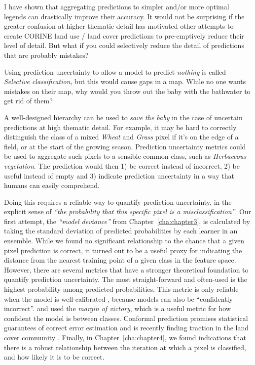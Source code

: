        I have shown that aggregating predictions to simpler and/or more optimal legends can drastically improve their accuracy. It would not be surprising if the greater confusion at higher thematic detail has motivated other attempts to create CORINE land use / land cover predictions to pre-emptively reduce their level of detail. But what if you could selectively reduce the detail of predictions that are probably mistakes? 
        
        Using prediction uncertainty to allow a model to predict \textit{nothing} is called \textit{Selective classification}, but this would cause gaps in a map. While no one wants mistakes on their map, why would you throw out the baby with the bathwater to get rid of them? 
        
        A well-designed hierarchy can be used to \textit{save the baby} in the case of uncertain predictions at high thematic detail. For example, it may be hard to correctly distinguish the class of a mixed \textit{Wheat} and \textit{Grass} pixel if it's on the edge of a field, or at the start of the growing season. Prediction uncertainty metrics could be used to aggregate such pixels to a sensible common class, such as \textit{Herbaceous vegetation}. The prediction would then 1) be correct instead of incorrect, 2) be useful instead of empty and 3) indicate prediction uncertainty in a way that humans can easily comprehend.

        Doing this requires a reliable way to quantify prediction uncertainty, in the explicit sense of \textit{``the probability that this specific pixel is a misclassification''}. Our first attempt, the \textit{``model deviance''} from Chapter\@~\ref{cha:chapter3}, is calculated by taking the standard deviation of predicted probabilities by each learner in an ensemble. While we found no significant relationship to the chance that a given pixel prediction is correct, it turned out to be a useful proxy for indicating the distance from the nearest training point of a given class in the feature space. However, there are several metrics that have a stronger theoretical foundation to quantify prediction uncertainty. The most straight-forward and often-used is the highest probability among predicted probabilities. This metric is only reliable when the model is well-calibrated \citep{niculescu2005predicting}, because models can also be ``confidently incorrect''. \citet{calderon2021high} and \citet{bonannella2023biomes} used the \textit{margin of victory}, which is a useful metric for how confident the model is between classes. Conformal prediction promises statistical guarantees of correct error estimation \citep{angelopoulos2023predictionpowered} and is recently finding traction in the land cover community \citep{valle2023quantifying, singh2024uncertainty}. Finally, in Chapter\@~\ref{cha:chapter4}, we found indications that there is a robust relationship between the iteration at which a pixel is classified, and how likely it is to be correct. 

